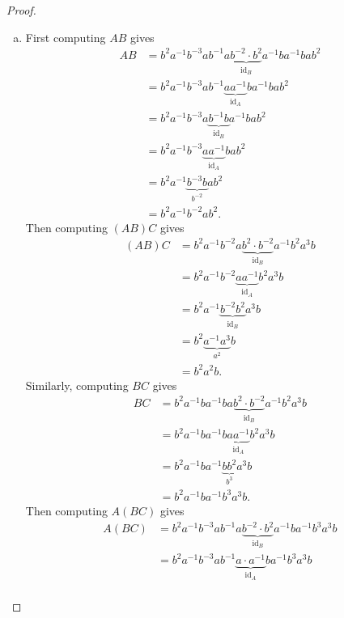 \documentclass{article}
\begin{document}
\begin{proof} \text{} \\
  \begin{enumerate}[(a)]
    \item First computing $AB$ gives \begin{align*}
      AB &= b^2 a^{-1} b^{-3} a b^{-1} a \underbrace{b^{-2} \cdot b^2}_{\operatorname{id}_B} a^{-1} b a^{-1} b a b^{2} \\
         &= b^2 a^{-1} b^{-3} a b^{-1} \underbrace{a a^{-1}}_{\operatorname{id}_A} b a^{-1} b a b^{2} \\
         &= b^2 a^{-1} b^{-3} a \underbrace{b^{-1} b}_{\operatorname{id}_B} a^{-1} b a b^{2} \\
         &= b^2 a^{-1} b^{-3} \underbrace{a a^{-1}}_{\operatorname{id}_A} b a b^{2} \\
         &= b^2 a^{-1} \underbrace{b^{-3} b}_{b^{-2}} a b^{2} \\
         &= b^2 a^{-1} b^{-2} a b^{2}.
    \end{align*}
    Then computing $(AB)C$ gives \begin{align*}
      (AB)C &= b^2 a^{-1} b^{-2} a \underbrace{b^{2} \cdot b^{-2}}_{\operatorname{id}_B} a^{-1} b^2 a^3 b \\
         &= b^2 a^{-1} b^{-2} \underbrace{a a^{-1}}_{\operatorname{id}_A} b^2 a^3 b \\
         &= b^2 a^{-1} \underbrace{b^{-2} b^2}_{\operatorname{id}_B} a^3 b \\
         &= b^2 \underbrace{a^{-1} a^3}_{a^2} b \\
         &= b^2 a^2 b.
    \end{align*}
    Similarly, computing $BC$ gives \begin{align*}
      BC &= b^2 a^{-1} b a^{-1} b a \underbrace{b^{2} \cdot b^{-2}}_{\operatorname{id}_B} a^{-1} b^2 a^3 b \\
         &= b^2 a^{-1} b a^{-1} b \underbrace{a a^{-1}}_{\operatorname{id}_A} b^2 a^3 b \\
         &= b^2 a^{-1} b a^{-1} \underbrace{b b^{2}}_{b^3} a^3 b \\
         &= b^2 a^{-1} b a^{-1} b^3 a^3 b.
    \end{align*}
    Then computing $A(BC)$ gives \begin{align*}
      A(BC) &= b^2 a^{-1} b^{-3} a b^{-1} a \underbrace{b^{-2} \cdot b^{2}}_{\operatorname{id}_B} a^{-1} b a^{-1} b^3 a^3 b \\
         &= b^2 a^{-1} b^{-3} a b^{-1} \underbrace{a \cdot a^{-1}}_{\operatorname{id}_A} b a^{-1} b^3 a^3 b \\

\end{align*}
\end{enumerate}
\end{proof}
\end{document}
